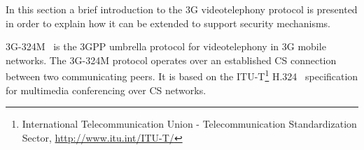 \documentclass[10pt, conference, compsocconf]{IEEEtran}
\begin{document}
In this section a brief introduction to the 3G videotelephony protocol is presented in order to explain how it can be extended to support security mechanisms.

3G-324M~\cite{3g324m} is the 3GPP umbrella protocol for videotelephony in 3G mobile networks. The 3G-324M protocol operates over an established CS connection between two communicating peers. It is based on the ITU-T\footnote{International Telecommunication Union - Telecommunication Standardization Sector, \url{http://www.itu.int/ITU-T/}} H.324~\cite{h324} specification for multimedia conferencing over CS networks.






\end{document}
